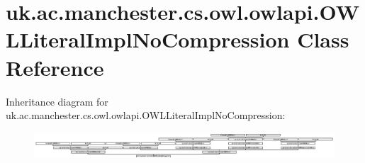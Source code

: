 \hypertarget{classuk_1_1ac_1_1manchester_1_1cs_1_1owl_1_1owlapi_1_1_o_w_l_literal_impl_no_compression}{\section{uk.\-ac.\-manchester.\-cs.\-owl.\-owlapi.\-O\-W\-L\-Literal\-Impl\-No\-Compression Class Reference}
\label{classuk_1_1ac_1_1manchester_1_1cs_1_1owl_1_1owlapi_1_1_o_w_l_literal_impl_no_compression}
}
Inheritance diagram for uk.\-ac.\-manchester.\-cs.\-owl.\-owlapi.\-O\-W\-L\-Literal\-Impl\-No\-Compression\-:\begin{figure}[H]
\begin{center}
\leavevmode
\includegraphics[height=0.987654cm]{classuk_1_1ac_1_1manchester_1_1cs_1_1owl_1_1owlapi_1_1_o_w_l_literal_impl_no_compression}
\end{center}
\end{figure}
